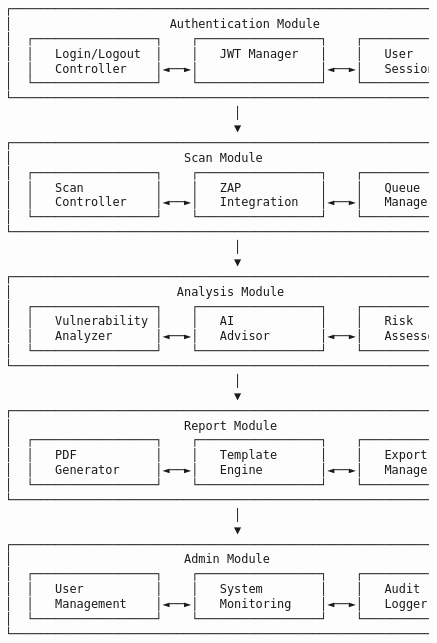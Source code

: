 \documentclass[main.tex]{subfiles}
\begin{document}
\begin{figure}[h]
\centering
\begin{lstlisting}[language=bash, caption=Модулын харилцан үйлчлэл]
┌─────────────────────────────────────────────────────────────────┐
│                      Authentication Module                      │
│  ┌─────────────────┐    ┌─────────────────┐    ┌─────────────┐  │
│  │   Login/Logout  │    │   JWT Manager   │    │   User      │  │
│  │   Controller    │◄──►│                 │◄──►│   Session   │  │
│  └─────────────────┘    └─────────────────┘    └─────────────┘  │
└─────────────────────────────────────────────────────────────────┘
                                │
                                ▼
┌─────────────────────────────────────────────────────────────────┐
│                        Scan Module                              │
│  ┌─────────────────┐    ┌─────────────────┐    ┌─────────────┐  │
│  │   Scan          │    │   ZAP           │    │   Queue     │  │
│  │   Controller    │◄──►│   Integration   │◄──►│   Manager   │  │
│  └─────────────────┘    └─────────────────┘    └─────────────┘  │
└─────────────────────────────────────────────────────────────────┘
                                │
                                ▼
┌─────────────────────────────────────────────────────────────────┐
│                       Analysis Module                           │
│  ┌─────────────────┐    ┌─────────────────┐    ┌─────────────┐  │
│  │   Vulnerability │    │   AI            │    │   Risk      │  │
│  │   Analyzer      │◄──►│   Advisor       │◄──►│   Assessor  │  │
│  └─────────────────┘    └─────────────────┘    └─────────────┘  │
└─────────────────────────────────────────────────────────────────┘
                                │
                                ▼
┌─────────────────────────────────────────────────────────────────┐
│                        Report Module                            │
│  ┌─────────────────┐    ┌─────────────────┐    ┌─────────────┐  │
│  │   PDF           │    │   Template      │    │   Export    │  │
│  │   Generator     │◄──►│   Engine        │◄──►│   Manager   │  │
│  └─────────────────┘    └─────────────────┘    └─────────────┘  │
└─────────────────────────────────────────────────────────────────┘
                                │
                                ▼
┌─────────────────────────────────────────────────────────────────┐
│                        Admin Module                             │
│  ┌─────────────────┐    ┌─────────────────┐    ┌─────────────┐  │
│  │   User          │    │   System        │    │   Audit     │  │
│  │   Management    │◄──►│   Monitoring    │◄──►│   Logger    │  │
│  └─────────────────┘    └─────────────────┘    └─────────────┘  │
└─────────────────────────────────────────────────────────────────┘
\end{lstlisting}
\end{figure}
\end{document}
